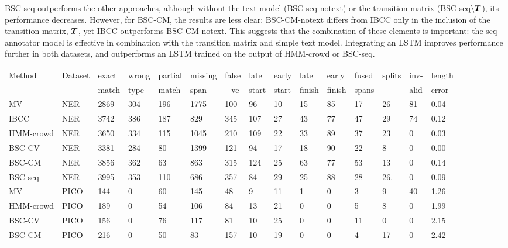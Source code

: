 BSC-seq outperforms the other approaches, although 
without the text model (BSC-seq-notext) or the transition matrix (BSC-seq$\backslash\boldsymbol T$),
its performance decreases.
However, for BSC-CM, the results are less clear: BSC-CM-notext differs from IBCC only in the 
inclusion of the transition matrix, $\boldsymbol T$, yet IBCC outperforms BSC-CM-notext.
This suggests that the combination of these elements is important: the seq annotator model is effective 
in combination with the transition matrix and simple text model.
Integrating an LSTM improves performance further in both datasets, and outperforms an LSTM trained on the output of HMM-crowd or BSC-seq.

\begin{table}[h]
\small
\centering
\setlength{\tabcolsep}{4pt}
\begin{tabular}{l l l l l l l l l l l l l l l }
\toprule
Method & Dataset & exact & wrong & partial  & missing  & false & late & early & late & early & fused & splits & inv- &  length \\ 
 & & match & type & match & span & +ve & start & start & finish & finish & spans &  & alid & error \\
\midrule
MV & NER & 2869 & 304 & 196 & 1775 & 100 & 96 & 10 & 15 & 85 & 17 & 26 & 81 & 0.04 \\
IBCC & NER & 3742 & 386 & 187 & 829 & 345 & 107 & 27 & 43 & 77 & 47 & 29 & 74 & 0.12 \\
HMM-crowd & NER & 3650 & 334 & 115 & 1045 & 210 & 109 & 22 & 33 & 89 & 37 & 23 & 0 & 0.03 \\
BSC-CV & NER & 3381 & 284 & 80 & 1399 & 121 & 94 & 17 & 18 & 90 & 22 & 8 & 0 & 0.00 \\
BSC-CM & NER & 3856 & 362 & 63 & 863 & 315 & 124 & 25 & 63 & 77 & 53 & 13 & 0 & 0.14 \\
BSC-seq & NER & 3995 & 353 & 110 & 686 & 357 &  84 &  29 &  25 &  88 &  28 &  26. & 0 & 0.09 \\
\midrule 
MV & PICO  & 144 & 0 & 60 & 145 & 48 & 9 & 11 & 1 & 0 & 3 & 9 & 40 & 1.26 \\
HMM-crowd& PICO & 189 & 0 & 54 & 106 & 84 & 13 & 21 & 0 & 0 & 5 & 8 & 0 & 1.99 \\
BSC-CV     & PICO & 156 & 0 & 76 & 117 & 81 & 10 & 25 & 0 & 0 & 11 & 0 & 0 & 2.15 \\
BSC-CM     & PICO & 216 & 0 & 50 & 83 & 157 & 10 & 19 & 0 & 0 & 4 & 17 & 0 & 2.42\\

\end{tabular}
\end{table}
